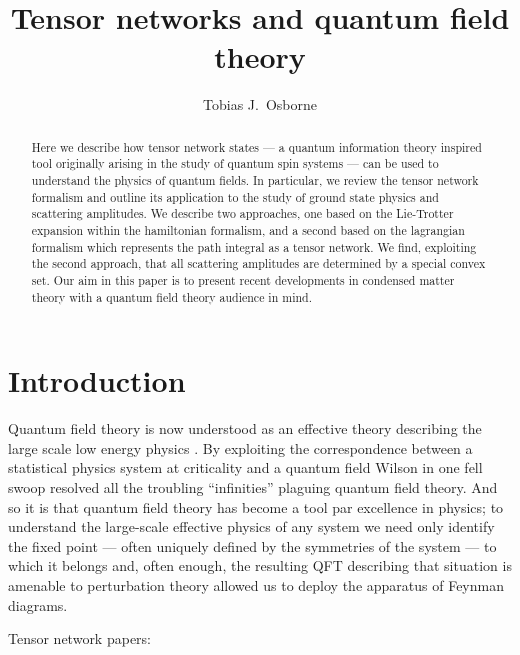 \documentclass[twocolumn,lengthcheck,superscriptaddress]{revtex4-1}
\theoremstyle{definition}
\theoremstyle{remark}
\begin{document}
\title{Tensor networks and quantum field theory}

\author{Tobias J.\ Osborne}

\begin{abstract}
	Here we describe how tensor network states --- a quantum information theory inspired tool originally arising in the study of quantum spin systems --- can be used to understand the physics of quantum fields. In particular, we review the tensor network formalism and outline its application to the study of ground state physics and scattering amplitudes. We describe two approaches, one based on the Lie-Trotter expansion within the hamiltonian formalism, and a second based on the lagrangian formalism which represents the path integral as a tensor network. We find, exploiting the second approach, that all scattering amplitudes are determined by a special convex set. Our aim in this paper is to present recent developments in condensed matter theory with a quantum field theory audience in mind. 
\end{abstract}

\maketitle

\section{Introduction }
Quantum field theory is now understood as an effective theory describing the large scale low energy physics \cite{wilson:1975a,wilson:1974a}. By exploiting the correspondence between a statistical physics system at criticality and a quantum field Wilson in one fell swoop resolved all the troubling ``infinities'' plaguing quantum field theory. And so it is that quantum field theory has become a tool par excellence in physics; to understand the large-scale effective physics of any system we need only identify the fixed point --- often uniquely defined by the symmetries of the system --- to which it belongs and, often enough, the resulting QFT describing that situation is amenable to perturbation theory allowed us to deploy the apparatus of Feynman diagrams. 

Tensor network papers: \cite{perez-garcia:2006a}\cite{orus:2013a, evenbly:2011a, evenbly:2009a}\cite{verstraete:2004a}
\cite{vidal:2007a}\cite{levin:2007a}\cite{gu:2009a}
\end{document}
